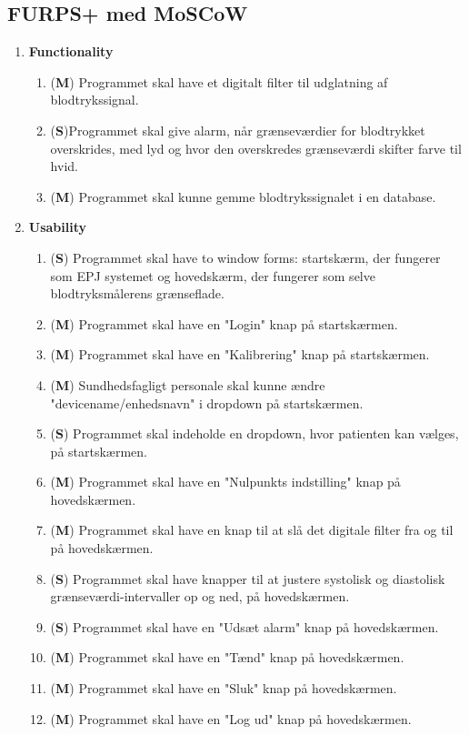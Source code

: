 \subsection{FURPS+ med MoSCoW}
\begin{enumerate}
\item \textbf{Functionality}
\begin{enumerate}
\item (\textbf{M}) Programmet skal have et digitalt filter til udglatning af blodtrykssignal.
\item (\textbf{S})Programmet skal give alarm, når grænseværdier for blodtrykket overskrides, med lyd og hvor den overskredes grænseværdi skifter farve til hvid.
\item (\textbf{M}) Programmet skal kunne gemme blodtrykssignalet i en database.
\end{enumerate}
\item \textbf{Usability}
\begin{enumerate}
\item (\textbf{S}) Programmet skal have to window forms: startskærm, der fungerer som  EPJ systemet og hovedskærm, der fungerer som selve blodtryksmålerens grænseflade.
\item (\textbf{M}) Programmet skal have en "Login" knap på startskærmen.
\item (\textbf{M}) Programmet skal have en "Kalibrering" knap på startskærmen.
\item (\textbf{M}) Sundhedsfagligt personale skal kunne ændre "devicename/enhedsnavn" i dropdown på startskærmen.
\item (\textbf{S}) Programmet skal indeholde en dropdown, hvor patienten kan vælges, på startskærmen.
\item (\textbf{M}) Programmet skal have en "Nulpunkts indstilling" knap på hovedskærmen.
\item (\textbf{M}) Programmet skal have en knap til at slå det digitale filter fra og til på hovedskærmen.
\item (\textbf{S}) Programmet skal have knapper til at justere systolisk og diastolisk grænseværdi-intervaller op og ned, på hovedskærmen.
\item (\textbf{S}) Programmet skal have en "Udsæt alarm" knap på hovedskærmen.
\item (\textbf{M}) Programmet skal have en "Tænd" knap på hovedskærmen.
\item (\textbf{M}) Programmet skal have en "Sluk" knap på hovedskærmen.
\item (\textbf{M}) Programmet skal have en "Log ud" knap på hovedskærmen.

\end{enumerate}
\end{enumerate}
